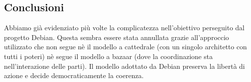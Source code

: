 \subsection{Conclusioni}
Abbiamo già evidenziato più volte la complicatezza nell'obiettivo perseguito dal progetto Debian. Questa sembra essere stata annullata grazie all'approccio utilizzato che non segue nè il modello a cattedrale (con un singolo architetto con tutti i poteri) nè segue il modello a bazaar (dove la coordinazione sta nell'interazione delle parti). 
Il modello adottato da Debian preserva la libertà di azione e decide democraticamente la coerenza. 